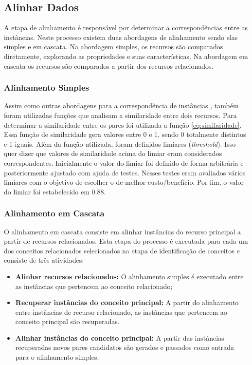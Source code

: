 \subsection{Alinhar Dados}
A etapa de alinhamento é responsável por determinar a correspondências entre as instâncias. Neste processo existem duas abordagens de alinhamento sendo elas simples e em cascata. Na abordagem simples, os recursos são comparados diretamente, explorando as propriedades e suas características. Na abordagem em cascata os recursos são comparados a partir dos recursos relacionados.

\subsubsection{Alinhamento Simples}
Assim como outras abordagens para a correspondência de instâncias \cite{zhang2016rimom}, também foram utilizadas funções que analisam a similaridade entre dois recursos. Para determinar a similaridade entre os pares foi utilizada a função \ref{eq:similaridade}. Essa função de similaridade gera valores entre 0 e 1, sendo 0 totalmente distintos e 1 iguais. Além da função utilizada, foram definidos limiares (\textit{threshold}). Isso quer dizer que valores de similaridade acima do limiar eram considerados correspondentes. 
Inicialmente o valor do limiar foi definido de forma arbitrária e posteriormente ajustado com ajuda de testes. Nesses testes eram avaliados vários limiares com o objetivo de escolher o de melhor custo/benefício. Por fim, o valor do limiar foi estabelecido em 0.88.


\subsubsection{Alinhamento em Cascata}
O alinhamento em cascata consiste em alinhar instâncias do recurso principal a partir de recursos relacionados. Esta etapa do processo é executada para cada um dos conceitos relacionados selecionados na etapa de identificação de conceitos e consiste de três atividades:
\begin{itemize}
	\item \textbf{Alinhar recursos relacionados:} O alinhamento simples é executado entre as instâncias que pertencem ao conceito relacionado;
	
	\item \textbf{Recuperar instâncias do conceito principal:} A partir do alinhamento entre instâncias de recurso relacionado, as instâncias que pertencem ao conceito principal são recuperadas.
	
	\item \textbf{Alinhar instâncias do conceito principal:} A partir das instâncias recuperadas novos pares candidatos são gerados e passados como entrada para o alinhamento simples.
\end{itemize}


